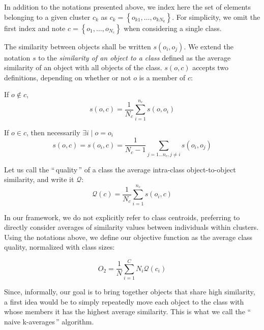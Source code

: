 \documentclass[natbib,smallextended]{svjour3}
\newcommand{\gl}[1]{``\,#1\,''} %
\begin{document}
In addition to the notations presented above, we index here the set of elements belonging to a given cluster $c_k$ as $c_k = \left\{o_{k1}, \ldots, o_{kN_k}\right\}$.
For simplicity, we omit the first index and note $c = \left\{o_1, \ldots, o_{N_c}\right\}$ when considering a single class.

The similarity between objects shall be written $s\left(o_i, o_j\right)$.
We extend the notation $s$ to the \emph{similarity of an object to a
  class} defined as the average similarity of an object
with all objects of the class. $s(o,c)$ accepts two definitions,
depending on whether or not $o$ is a member of $c$:

If $o \notin c$,
\begin{equation}
  s\left(o,c\right) = \frac{1}{N_c} \sum_{i=1}^{n_c}s\left(o, o_i\right)
   \label{eq:soc_notinclass}
\end{equation}

If $o \in c$, then necessarily $\exists i \mid o = o_i$
\begin{equation}
  s\left(o,c\right) = s\left(o_i, c\right) = \frac{1}{N_c-1} \sum_{j=1 \ldots n_c, j \neq i} s\left(o_i, o_j\right)
  	 \label{eq:soc_inclass}
\end{equation}

Let us call the \gl{quality} of a class the average intra-class object-to-object similarity, and write it $\mathcal{Q}$:
\[
\mathcal{Q}\left(c\right) = \frac{1}{N_c} \sum_{i=1}^{n_c} s\left(o_i, c\right)
\]


In our framework, we do not explicitly refer to class centroids, preferring to directly consider averages of similarity values between individuals within clusters. Using the notations above, we define our objective function as the average class quality, normalized with class sizes:

\[
O_2 = \frac{1}{N} \sum_{i=1}^{C} N_i \mathcal{Q}(c_i)
\]

Since, informally, our goal is to bring together objects that share high similarity, a first idea would be to simply repeatedly move each object to the class with whose members it has the highest average similarity. This is what we call the \gl{naive k-averages} algorithm.
\end{document}
